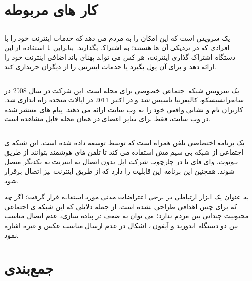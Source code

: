 \section{کار های مربوطه}
\subsection{}
 \href{https://www.opengarden.com}{}%
یک سرویس است که این امکان را به مردم می دهد که  خدمات اینترنت خود را با افرادی که در نزدیکی آن ها هستند؛ به اشتراک بگذارند. بنابراین با استفاده از این دستگاه اشتراک گذاری اینترنت، هر کس می تواند پهنای باند اضافی اینترنت خود را ارائه دهد و برای آن پول بگیرد یا خدمات اینترنتی را از دیگران خریداری کند.

\subsection{} 
 \href{https://nextdoor.com}{}%
یک سرویس شبکه اجتماعی خصوصی برای محله است. این شرکت در سال 2008 در سانفرانسیسکو، کالیفرنیا تاسیس شد و در اکتبر 2011 در ایالات متحده راه اندازی شد. کاربران 
نام و نشانی واقعی خود را به وب سایت ارائه می دهند. پیام های منتشر شده در وب سایت، فقط برای سایر اعضای  
در همان محله قابل مشاهده است.
\subsection{}
 \href{https://www.opengarden.com/firechat/}{}%
یک برنامه اختصاصی تلفن همراه است که توسط
توسعه داده شده است. این شبکه ی اجتماعی از شبکه بی سیم مش استفاده می کند تا تلفن های هوشمند بتوانند از طریق بلوتوث، وای فای یا در چارچوب
شرکت اپل بدون اتصال به اینترنت به یکدیگر متصل شوند. همچنین این برنامه این قابلیت را دارد که از طریق اینترنت نیز اتصال برقرار شود.

به عنوان یک ابزار ارتباطی در برخی اعتراضات مدنی مورد استفاده قرار گرفت؛ اگر چه که برای چنین اهدافی طراحی نشده است. از جمله دلایلی که این شبکه ی اجتماعی محبوبیت چندانی بین مردم ندارد؛ می توان به ضعف در پیاده سازی، عدم اتصال مناسب بین دو دستگاه اندورید
و آیفون
، اشکال در عدم ارسال مناسب عکس و غیره اشاره نمود.    
  
\section{جمع‌بندی}
